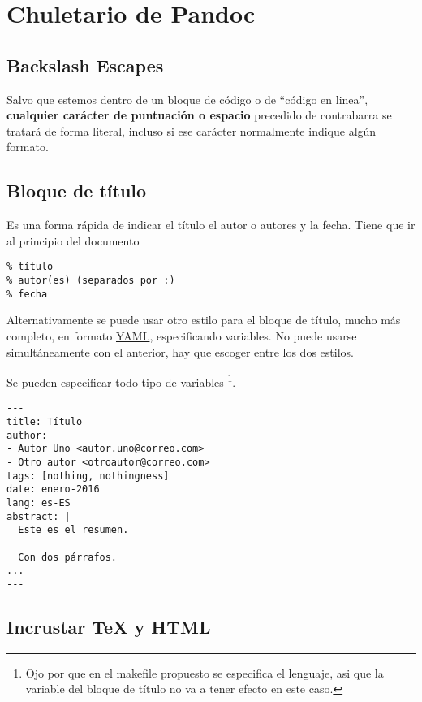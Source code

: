 \documentclass[12pt,es-ES,]{article}
\begin{document}
\section{Chuletario de Pandoc}\label{chuletario-de-pandoc}

\subsection{Backslash Escapes}\label{backslash-escapes}

Salvo que estemos dentro de un bloque de código o de ``código en
linea'', \textbf{cualquier carácter de puntuación o espacio} precedido
de contrabarra se tratará de forma literal, incluso si ese carácter
normalmente indique algún formato.

\subsection{Bloque de título}\label{bloque-de-tuxedtulo}

Es una forma rápida de indicar el título el autor o autores y la fecha.
Tiene que ir al principio del documento

\begin{verbatim}
% título
% autor(es) (separados por :)
% fecha
\end{verbatim}

Alternativamente se puede usar otro estilo para el bloque de título,
mucho más completo, en formato
\href{https://en.wikipedia.org/wiki/YAML}{YAML}, especificando
variables. No puede usarse simultáneamente con el anterior, hay que
escoger entre los dos estilos.

Se pueden especificar todo tipo de variables \footnote{Ojo por que en el
  makefile propuesto se especifica el lenguaje, asi que la variable del
  bloque de título no va a tener efecto en este caso.}.

\begin{verbatim}
---
title: Título
author:
- Autor Uno <autor.uno@correo.com>
- Otro autor <otroautor@correo.com>
tags: [nothing, nothingness]
date: enero-2016
lang: es-ES
abstract: |
  Este es el resumen.

  Con dos párrafos.
...
---
\end{verbatim}

\subsection{Incrustar TeX y HTML}\label{incrustar-tex-y-html}
\end{document}
